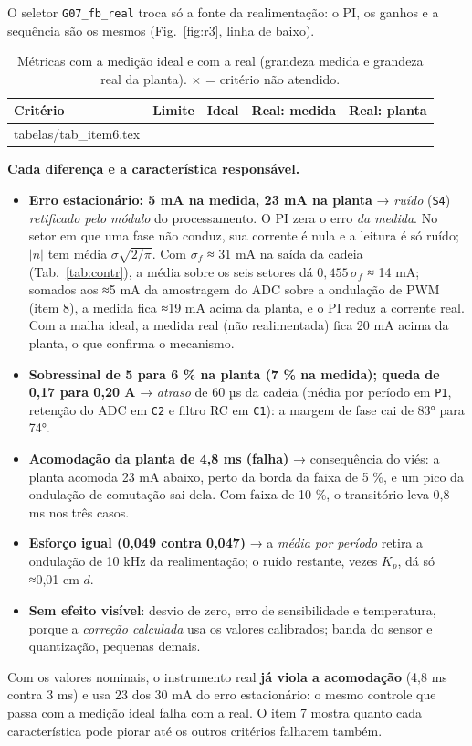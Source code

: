 \documentclass[10pt,a4paper]{article}
\newcommand{\R}[1]{\FloatBarrier\par\medskip\noindent{\large\bfseries #1}\par\smallskip}
\begin{document}
\R{6. Controle com instrumento real}
O seletor \texttt{G07\_fb\_real} troca só a fonte da realimentação: o PI, os ganhos e a sequência são os mesmos (Fig.~\ref{fig:r3}, linha de baixo).

\begin{table}[!htbp]\centering\footnotesize
\caption{Métricas com a medição ideal e com a real (grandeza medida e grandeza real da planta). $\times$ = critério não atendido.}\label{tab:r3}
\begin{tabular}{lrrrr}\toprule
Critério & Limite & Ideal & Real: medida & Real: planta\\\midrule
{} tabelas/tab_item6.tex \bottomrule
\end{tabular}
\end{table}

\textbf{Cada diferença e a característica responsável.}
\begin{itemize}
\item \textbf{Erro estacionário: 5 mA na medida, 23 mA na planta} → \emph{ruído} (\texttt{S4}) \emph{retificado pelo módulo} do processamento. O PI zera o erro \emph{da medida}. No setor em que uma fase não conduz, sua corrente é nula e a leitura é só ruído; $|n|$ tem média $\sigma\sqrt{2/\pi}$. Com $\sigma_f$ ≈ 31 mA na saída da cadeia (Tab.~\ref{tab:contr}), a média sobre os seis setores dá $0{,}455\,\sigma_f$ ≈ 14 mA; somados aos ≈5 mA da amostragem do ADC sobre a ondulação de PWM (item 8), a medida fica ≈19 mA acima da planta, e o PI reduz a corrente real. Com a malha ideal, a medida real (não realimentada) fica 20 mA acima da planta, o que confirma o mecanismo.
\item \textbf{Sobressinal de 5 para 6 \% na planta (7 \% na medida); queda de 0,17 para 0,20 A} → \emph{atraso} de 60 µs da cadeia (média por período em \texttt{P1}, retenção do ADC em \texttt{C2} e filtro RC em \texttt{C1}): a margem de fase cai de 83° para 74°.
\item \textbf{Acomodação da planta de 4,8 ms (falha)} → consequência do viés: a planta acomoda 23 mA abaixo, perto da borda da faixa de 5 \%, e um pico da ondulação de comutação sai dela. Com faixa de 10 \%, o transitório leva 0,8 ms nos três casos.
\item \textbf{Esforço igual (0,049 contra 0,047)} → a \emph{média por período} retira a ondulação de 10 kHz da realimentação; o ruído restante, vezes $K_p$, dá só ≈0,01 em $d$.
\item \textbf{Sem efeito visível}: desvio de zero, erro de sensibilidade e temperatura, porque a \emph{correção calculada} usa os valores calibrados; banda do sensor e quantização, pequenas demais.
\end{itemize}
Com os valores nominais, o instrumento real \textbf{já viola a acomodação} (4,8 ms contra 3 ms) e usa 23 dos 30 mA do erro estacionário: o mesmo controle que passa com a medição ideal falha com a real. O item 7 mostra quanto cada característica pode piorar até os outros critérios falharem também.
\end{document}
